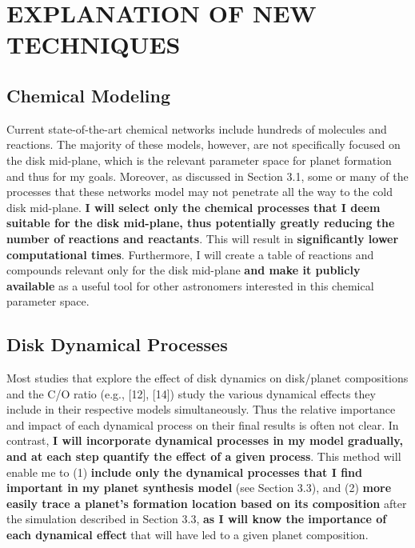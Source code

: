 \documentclass[12pt, letterpaper]{article}
\begin{document}
\section{EXPLANATION OF NEW TECHNIQUES}


\subsection{Chemical Modeling}

Current state-of-the-art chemical networks include hundreds of molecules and reactions. The majority of these models, however, are not specifically focused on the disk mid-plane, which is the relevant parameter space for planet formation and thus for my goals. Moreover, as discussed in Section 3.1, some or many of the processes that these networks model may not penetrate all the way to the cold disk mid-plane. \textbf{I will select only the chemical processes that I deem suitable for the disk mid-plane, thus potentially greatly reducing the number of reactions and reactants}. This will result in \textbf{significantly lower computational times}. Furthermore, I will create a table of reactions and compounds relevant only for the disk mid-plane \textbf{and make it publicly available} as a useful tool for other astronomers interested in this chemical parameter space. 

\subsection{Disk Dynamical Processes} 

Most studies that explore the effect of disk dynamics on disk/planet compositions and the C/O ratio (e.g., [12], [14]) study the various dynamical effects they include in their respective models simultaneously. Thus the relative importance and impact of each dynamical process on their final results is often not clear. In contrast, \textbf{I will incorporate dynamical processes in my model gradually, and at each step quantify the effect of a given process}. This method will enable me to (1) \textbf{include only the dynamical processes that I find important in my planet synthesis model} (see Section 3.3), and (2) \textbf{more easily trace a planet's formation location based on its composition} after the simulation described in Section 3.3, \textbf{as I will know the importance of each dynamical effect} that will have led to a given planet composition. 
\end{document}
